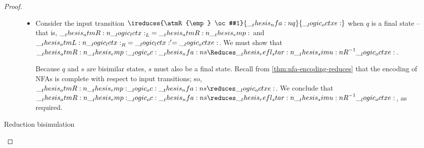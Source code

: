 \begin{proof}
\begin{description}
\begin{itemize}
    \item Consider the input transition $\ireduces{\atmR{\emp} \oc #1}{\nfa{q}}{\octxe}$ when $q$ is a final state -- that is, $\__thesis_atmR:n {\__logic_lctx:}_L = \__thesis_atmR:n {\__thesis_emp:}$ and $\__thesis_atmL:n {\__logic_lctx:}_R = \__logic_lctx:' = \__logic_octxe:$.
      We must show that $\atmR{\emp} \oc \nfa{s} \Reduces\refl*{\simu{R}}^{-1} \octxe$.

      Because $q$ and $s$ are bisimilar states, $s$ must also be a final state.
      Recall from \cref{thm:nfa-encoding-reduces} that the encoding of \acp{NFA} is complete with respect to input transitions; so, $\atmR{\emp} \oc \nfa{s} \reduces \octxe$.
      We conclude that $\atmR{\emp} \oc \nfa{s} \reduces\refl*{\simu{R}}^{-1} \octxe$, as required.
    \end{itemize}
  \item[Reduction bisimulation]
  \end{description}
\end{proof}

